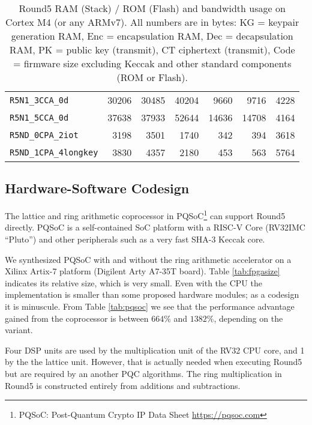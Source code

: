 \documentclass[a4paper]{article}
\begin{document}
\begin{table}
\begin{center}
\begin{tabular}{| l | n{5}{0} n{5}{0} n{5}{0} | n{5}{0} n{5}{0} | n{5}{0} | }
    \verb|R5N1_3CCA_0d| & 30206 & 30485 & 40204 & 9660  & 9716  & 4228 \\
    \verb|R5N1_5CCA_0d| & 37638 & 37933 & 52644 & 14636 & 14708 & 4164 \\
    \verb|R5ND_0CPA_2iot| & 3198  & 3501  & 1740  & 342 & 394   & 3618 \\
    \verb|R5ND_1CPA_4longkey| & 3830 & 4357 & 2180 & 453 & 563  & 5764 \\
    \hline
    \end{tabular}
    \caption{Round5 RAM (Stack) / ROM (Flash) and bandwidth usage on
        Cortex M4 (or any ARMv7). All numbers are in bytes:
        {KG} = keypair generation RAM,  {Enc} = encapsulation RAM,
        {Dec} = decapsulation RAM,      {PK} = public key (transmit),
        {CT} ciphertext (transmit),     {Code} = firmware size excluding
        Keccak and other standard  components (ROM or Flash).}
    \label{tab:m4size}
\end{center}
\end{table}

\subsection{Hardware-Software Codesign}

The lattice and ring arithmetic coprocessor in PQSoC\footnote{PQSoC:
Post-Quantum Crypto IP Data Sheet \url{https://pqsoc.com}} can support
Round5 directly. PQSoC is a self-contained SoC platform with a
RISC-V Core (RV32IMC ``Pluto'') and other peripherals such as a very
fast SHA-3 Keccak core.

We synthesized PQSoC with and without the ring arithmetic accelerator on
a Xilinx Artix-7 platform (Digilent Arty A7-35T board). Table
\ref{tab:fpgasize} indicates its relative size, which is very small.
Even with the CPU the implementation is smaller than some proposed
hardware modules; as a codesign it is minuscule.
From Table \ref{tab:pqsoc} we see that the performance advantage
gained from the coprocessor is between $664\%$ and $1382\%$, depending
on the variant.

Four DSP units are used by the multiplication unit of the RV32 CPU core,
and 1 by the the lattice unit. However, that is actually needed when
executing Round5 but are required by an another PQC algorithms. The ring
multiplication in Round5 is constructed entirely from additions and
subtractions.
\end{document}
